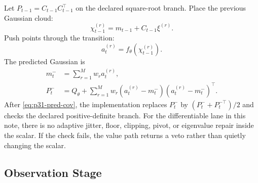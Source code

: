 \documentclass[11pt]{article}
\numberwithin{equation}{section}
\begin{document}
Let \(P_{t-1}=C_{t-1}C_{t-1}^\top\) on the declared square-root branch.  Place
the previous Gaussian cloud:
\begin{equation}
  \chi_{t-1}^{(r)}
  =
  m_{t-1}+C_{t-1}\xi^{(r)}.
  \label{eq:p31-pred-placed-points}
\end{equation}
Push points through the transition:
\begin{equation}
  a_t^{(r)}=f_\theta(\chi_{t-1}^{(r)}).
  \label{eq:p31-transition-points}
\end{equation}
The predicted Gaussian is
\begin{align}
  m_t^-&=\sum_{r=1}^Mw_ra_t^{(r)},
  \label{eq:p31-pred-mean}\\
  P_t^-&=Q_\theta+\sum_{r=1}^Mw_r
  (a_t^{(r)}-m_t^-)(a_t^{(r)}-m_t^-)^\top.
  \label{eq:p31-pred-cov}
\end{align}
After \eqref{eq:p31-pred-cov}, the implementation replaces \(P_t^-\) by
\((P_t^-+P_t^{-\top})/2\) and checks the declared positive-definite branch.
For the differentiable lane in this note, there is no adaptive jitter, floor,
clipping, pivot, or eigenvalue repair inside the scalar.  If the check fails,
the value path returns a veto rather than quietly changing the scalar.

\subsection{Observation Stage}
\end{document}
